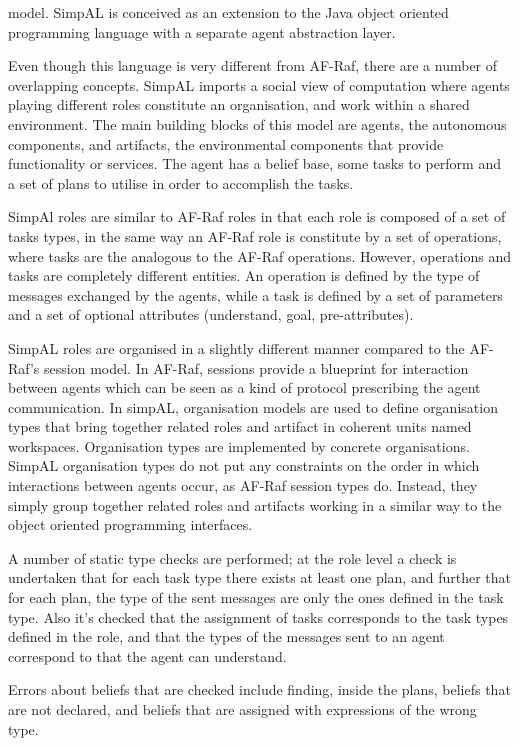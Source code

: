 \documentclass[a4paper,12pt,oneside,fleqn]{book} %
\begin{document}
{model. SimpAL is conceived as an extension to the Java object oriented
programming language with a separate agent abstraction layer.

Even though this language is very different from AF-Raf, there are a number
of overlapping concepts. SimpAL imports a social view of computation where
agents playing different roles constitute an organisation, and work within
a shared environment. The main building blocks of this model are agents,
the autonomous components, and artifacts, the environmental components that
provide functionality or services. The agent has a belief base, some tasks
to perform and a set of plans to utilise in order to accomplish the tasks.

SimpAl roles are similar to AF-Raf roles in that each role is composed of a
set of tasks types, in the same way an AF-Raf role is constitute by a set
of operations, where tasks are the analogous to the AF-Raf operations.
However, operations and tasks are completely different entities. An
operation is defined by the type of messages exchanged by the agents, while
a task is defined by a set of parameters and a set of optional attributes
(understand, goal, pre-attributes).

SimpAL roles are organised in a slightly different manner compared to the
AF-Raf's session model. In AF-Raf, sessions provide a blueprint for
interaction between agents which can be seen as a kind of protocol
prescribing the agent communication. In simpAL, organisation models are used
to define organisation types that bring together related roles and
artifact in coherent units named workspaces. Organisation types are
implemented by concrete organisations. SimpAL organisation types do not put
any constraints on the order in which interactions between agents occur, as
AF-Raf session types do. Instead, they simply group together related roles
and artifacts working in a similar way to the object oriented programming
interfaces.

A number of static type checks are performed; at the role level a check is
undertaken that for each task type there exists at least one plan, and
further that for each plan, the type of the sent messages are only the ones
defined in the task type. Also it's checked that the assignment of tasks
corresponds to the task types defined in the role, and that the types of
the messages sent to an agent correspond to that the agent can understand.

Errors about beliefs that are checked include finding, inside the plans,
beliefs that are not declared, and beliefs that are assigned with
expressions of the wrong type.

}
\end{document}
